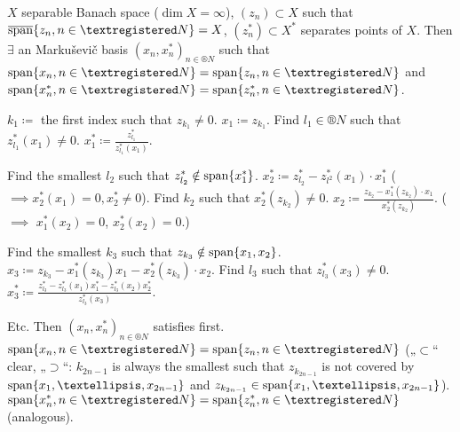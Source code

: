 \documentclass[12pt]{article}					%
\begin{document}
\begin{veta}[Markuševič]
	$X$ separable Banach space ($\dim X = ∞$), $(z_n) \subset X$ such that $\overline{\spn}\{z_n, n \in ®N\} = X$, $(z_n^*) \subset X^*$ separates points of $X$. Then $\exists$ an Markuševič basis $(x_n, x_n^*)_{n \in ®N}$ such that $\spn \{x_n, n \in ®N\} = \spn\{z_n, n \in ®N\}$ and $\spn \{x_n^*, n \in ®N\} = \spn \{z_n^*, n \in ®N\}$.

	\begin{dukazin}
		$k_1 \coloneq$ the first index such that $z_{k_1} ≠ 0$. $x_1 \coloneq z_{k_1}$. Find $l_1 \in ®N$ such that $z^*_{l_1}(x_1) ≠ 0$. $x_1^* \coloneq \frac{z_{l_1}^*}{z_{l_1}^*(x_1)}$.

		Find the smallest $l_2$ such that $z_{l_2}^* \notin \operatorname{span} \{x_1^*\}$. $x_2^* \coloneq z_{l_2}^* - z_{l^2}^*(x_1)·x_1^*$ ($\implies x_2^*(x_1) = 0, x_2^* ≠ 0$). Find $k_2$ such that $x_2^*(z_{k_2}) ≠ 0$. $x_2 \coloneq \frac{z_{k_2} - x_1^*(z_{k_2})·x_1}{x_2^*(z_{k_2})}$. ($\implies$ $x_1^*(x_2) = 0$, $x_2^*(x_2) = 0$.)

		Find the smallest $k_3$ such that $z_{k_3} \notin \operatorname{span}\{x_1, x_2\}$. $x_3 \coloneq z_{k_3} - x_1^*(z_{k_3})x_1 - x_2^*(z_{k_3})·x_2$. Find $l_3$ such that $z_{l_3}^*(x_3) ≠ 0$. $x_3^* \coloneq \frac{z_{l_3}^* - z_{l_3}^*(x_1)x_1^* - z_{l_3}^*(x_2)x_2^*}{z_{l_3}^*(x_3)}$.

		Etc. Then $(x_n, x_n^*)_{n \in ®N}$ satisfies first. $\spn \{x_n, n \in ®N\} = \spn \{z_n, n \in ®N\}$ („$\subset$“ clear, „$\supset$“: $k_{2n - 1}$ is always the smallest such that $z_{k_{2n - 1}}$ is not covered by $\spn \{x_1, …, x_{2n-1}\}$ and $z_{k_{2n - 1}} \in \spn \{x_1, …, x_{2n - 1}\}$). $\spn \{x_n^*, n \in ®N\} = \spn \{z_n^*, n \in ®N\}$ (analogous).
	\end{dukazin}
\end{veta}
\end{document}
